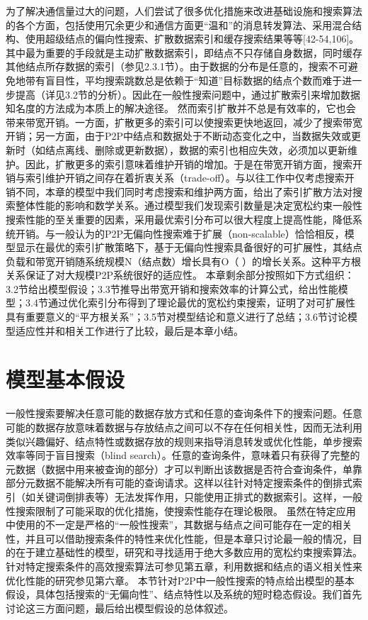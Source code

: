 为了解决通信量过大的问题，人们尝试了很多优化措施来改进基础设施和搜索算法的各个方面，包括使用冗余更少和通信方面更“温和”的消息转发算法、采用混合结构、使用超级结点的偏向性搜索、扩散数据索引和缓存搜索结果等等[42-54,106]。其中最为重要的手段就是主动扩散数据索引，即结点不只存储自身数据，同时缓存其他结点所存数据的索引（参见2.3.1节）。由于数据的分布是任意的，搜索不可避免地带有盲目性，平均搜索跳数总是依赖于“知道”目标数据的结点个数而难于进一步提高（详见3.2节的分析）。因此在一般性搜索问题中，通过扩散索引来增加数据知名度的方法成为本质上的解决途径。
然而索引扩散并不总是有效率的，它也会带来带宽开销。一方面，扩散更多的索引可以使搜索更快地返回，减少了搜索带宽开销；另一方面，由于P2P中结点和数据处于不断动态变化之中，当数据失效或更新时（如结点离线、删除或更新数据），数据的索引也相应失效，必须加以更新维护。因此，扩散更多的索引意味着维护开销的增加。于是在带宽开销方面，搜索开销与索引维护开销之间存在着折衷关系（trade-off）。与以往工作中仅考虑搜索开销不同，本章的模型中我们同时考虑搜索和维护两方面，给出了索引扩散方法对搜索整体性能的影响和数学关系。通过模型我们发现索引数量是决定宽松约束一般性搜索性能的至关重要的因素，采用最优索引分布可以很大程度上提高性能，降低系统开销。与一般认为的P2P无偏向性搜索难于扩展（non-scalable）恰恰相反，模型显示在最优的索引扩散策略下，基于无偏向性搜索具备很好的可扩展性，其结点负载和带宽开销随系统规模N（结点数）增长具有O（ ）的增长关系。这种平方根关系保证了对大规模P2P系统很好的适应性。
本章剩余部分按照如下方式组织：3.2节给出模型假设；3.3节推导出带宽开销和搜索效率的计算公式，给出性能模型；3.4节通过优化索引分布得到了理论最优的宽松约束搜索，证明了对可扩展性具有重要意义的“平方根关系”；3.5节对模型结论和意义进行了总结；3.6节讨论模型适应性并和相关工作进行了比较，最后是本章小结。




\section{模型基本假设}

一般性搜索要解决任意可能的数据存放方式和任意的查询条件下的搜索问题。任意可能的数据存放意味着数据与存放结点之间可以不存在任何相关性，因而无法利用类似兴趣偏好、结点特性或数据存放的规则来指导消息转发或优化性能，单步搜索效率等同于盲目搜索（blind search）。任意的查询条件，意味着只有获得了完整的元数据（数据中用来被查询的部分）才可以判断出该数据是否符合查询条件，单靠部分元数据不能解决所有可能的查询请求。这样以往针对特定搜索条件的倒排式索引（如关键词倒排表等）无法发挥作用，只能使用正排式的数据索引。这样，一般性搜索限制了可能采取的优化措施，使搜索性能存在理论极限。
虽然在特定应用中使用的不一定是严格的“一般性搜索”，其数据与结点之间可能存在一定的相关性，并且可以借助搜索条件的特性来优化性能，但是本章只讨论最一般的情况，目的在于建立基础性的模型，研究和寻找适用于绝大多数应用的宽松约束搜索算法。针对特定搜索条件的高效搜索算法可参见第五章，利用数据和结点的语义相关性来优化性能的研究参见第六章。
本节针对P2P中一般性搜索的特点给出模型的基本假设，具体包括搜索的“无偏向性”、结点特性以及系统的短时稳态假设。我们首先讨论这三方面问题，最后给出模型假设的总体叙述。


